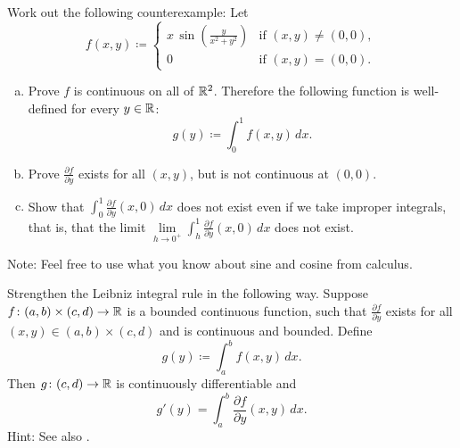\begin{exercise}
\pagebreak[2]
Work out the following counterexample:  Let
\begin{equation*}
f(x,y) \coloneqq
\begin{cases}
x \,\sin \left(\frac{y}{x^2+y^2}\right) & \text{if } (x,y) \not= (0,0),\\
0                                       & \text{if } (x,y)=(0,0).
\end{cases}
\end{equation*}
\begin{enumerate}[a)]
\item
Prove $f$ is continuous on all of ${\mathbb{R}}^2$.
Therefore the following function is well-defined for every $y \in {\mathbb{R}}$:
\begin{equation*}
g(y) \coloneqq \int_0^1 f(x,y) \, dx .
\end{equation*}
\item
Prove $\frac{\partial f}{\partial y}$ exists for all $(x,y)$,
but is not continuous at $(0,0)$.
\item
Show that $\int_0^1 \frac{\partial f}{\partial y}(x,0) \, dx$ does not
exist even if we take improper integrals, that is,
that the limit
$\lim\limits_{h \to 0^+} \int_h^1 \frac{\partial f}{\partial y}(x,0) \, dx$
does not exist.
\end{enumerate}
Note: Feel free to use what you know about sine and cosine from calculus.
\end{exercise}

\begin{exercise} \label{exercise:strongerleibniz}
\pagebreak[3]
Strengthen the Leibniz integral rule in the following way.
Suppose $f \colon (a,b) \times (c,d) \to {\mathbb{R}}$ is a bounded continuous function,
such that $\frac{\partial f}{\partial y}$ exists for all $(x,y) \in (a,b)
\times (c,d)$ and is continuous and bounded.  Define
\begin{equation*}
g(y) \coloneqq \int_a^b f(x,y) \,dx .
\end{equation*}
Then $g \colon (c,d) \to {\mathbb{R}}$ is continuously differentiable and
\begin{equation*}
g'(y) = \int_a^b \frac{\partial f}{\partial y}(x,y) \,dx .
\end{equation*}
Hint: See also .
\end{exercise}

